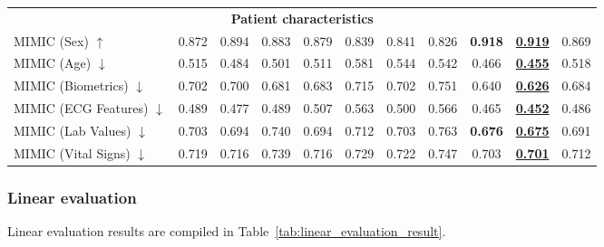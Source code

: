\documentclass{article}
\begin{document}
\begin{table}[t]
\begin{tabular}{lcccccccccc}
                    \multicolumn{11}{c}{\textbf{Patient characteristics}} \\
                    MIMIC (Sex) $\uparrow$ & 0.872 & 0.894 & 0.883 & 0.879 & 0.839 & 0.841 & 0.826 & \textbf{0.918} & \textbf{\underline{0.919}} & 0.869 \\
                    MIMIC (Age) $\downarrow$ & 0.515 & 0.484 & 0.501 & 0.511 & 0.581 & 0.544 & 0.542 & 0.466 & \textbf{\underline{0.455}} & 0.518 \\
                    MIMIC (Biometrics) $\downarrow$ & 0.702 & 0.700 & 0.681 & 0.683 & 0.715 & 0.702 & 0.751 & 0.640 & \textbf{\underline{0.626}} & 0.684 \\
                    MIMIC (ECG Features) $\downarrow$ & 0.489 & 0.477 & 0.489 & 0.507 & 0.563 & 0.500 & 0.566 & 0.465 & \textbf{\underline{0.452}} & 0.486 \\
                    MIMIC (Lab Values) $\downarrow$ & 0.703 & 0.694 & 0.740 & 0.694 & 0.712 & 0.703 & 0.763 & \textbf{0.676} & \textbf{\underline{0.675}} & 0.691 \\
                    MIMIC (Vital Signs) $\downarrow$ & 0.719 & 0.716 & 0.739 & 0.716 & 0.729 & 0.722 & 0.747 & 0.703 & \textbf{\underline{0.701}} & 0.712 \\
        
        
                    \bottomrule
                \end{tabular}
            \end{table}
            

            \subsubsection{Linear evaluation}
            Linear evaluation results are compiled in Table~\ref{tab:linear_evaluation_result}.
\end{document}
